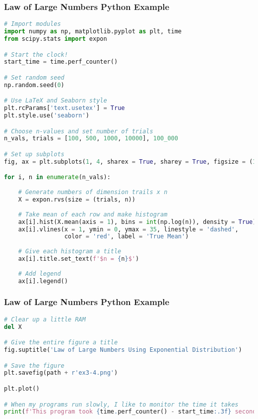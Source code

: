 \documentclass{beamer}
\begin{document}
\begin{frame}[fragile]
\frametitle{Law of Large Numbers Python Example}

\begin{lstlisting}[language=Python]
# Import modules
import numpy as np, matplotlib.pyplot as plt, time
from scipy.stats import expon

# Start the clock!
start_time = time.perf_counter()

# Set random seed
np.random.seed(0)

# Use LaTeX and Seaborn style
plt.rcParams['text.usetex'] = True
plt.style.use('seaborn')

# Choose n-values and set number of trials
n_vals, trials = [100, 500, 1000, 10000], 100_000

# Set up subplots
fig, ax = plt.subplots(1, 4, sharex = True, sharey = True, figsize = (12, 4))

for i, n in enumerate(n_vals):
    
    # Generate numbers of dimension trails x n
    X = expon.rvs(size = (trials, n))   
     
    # Take mean of each row and make histogram
    ax[i].hist(X.mean(axis = 1), bins = int(np.log(n)), density = True)
    ax[i].vlines(x = 1, ymin = 0, ymax = 35, linestyle = 'dashed', 
                 color = 'red', label = 'True Mean')
    
    # Give each histogram a title
    ax[i].title.set_text(f'$n = {n}$')
    
    # Add legend
    ax[i].legend()
\end{lstlisting}
\end{frame}

\begin{frame}[fragile]
\frametitle{Law of Large Numbers Python Example}

\begin{lstlisting}[language=Python]
# Clear up a little RAM
del X

# Give the entire figure a title
fig.suptitle('Law of Large Numbers Using Exponential Distribution')

# Save the figure
plt.savefig(path + r'ex3-4.png')

plt.plot()

# When my programs run slowly, I like to monitor the time it takes
print(f'This program took {time.perf_counter() - start_time:.3f} seconds.')
\end{lstlisting}
\end{frame}
\end{document}
